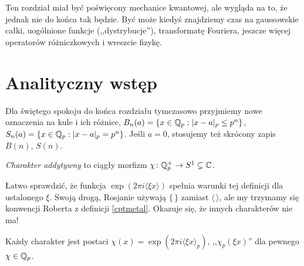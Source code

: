 Ten rozdział miał być poświęcony mechanice kwantowej, ale wygląda na to, że jednak nie do końca tak będzie.
Być może kiedyś znajdziemy czas na gaussowskie całki, uogólnione funkcje (,,dystrybucje''), transformatę Fouriera, jeszcze więcej operatorów różniczkowych i wreszcie fizykę.

\section{Analityczny wstęp}
Dla  świętego spokoju do końca rozdziału tymczasowo przyjmiemy nowe oznaczenia na kule i ich różnice, $B_n(a) = \{x \in \mathbb Q_p: |x - a|_p \le p^n\}$, $S_n(a) = \{x \in \mathbb Q_p: |x - a|_p = p^n\}$.
Jeśli $a=0$, stosujemy też skrócony zapis $B(n)$, $S(n)$.

\begin{definicja} \label{underpressure}
	\emph{Charakter addytywny}  to ciągły morfizm $\chi \colon \mathbb Q_p^+ \to S^1 \subsetneq \mathbb C$.
\end{definicja}

Łatwo sprawdzić, że funkcja $\exp (2 \pi i \langle\xi x\rangle)$ spełnia warunki tej definicji dla ustalonego $\xi$. 
Swoją drogą, Rosjanie używają $\{\,\}$ zamiast $\langle \,\rangle$, ale my trzymamy się konwencji Roberta z definicji \ref{cptmetal}.
Okazuje się, że innych charakterów nie ma!

\begin{fakt}
	Każdy charakter jest postaci $\chi(x) = \exp(2 \pi i \langle \xi x \rangle_p)$, ,,$\chi_p(\xi x)$'' dla pewnego $\chi \in \mathbb Q_p$.
\end{fakt}

